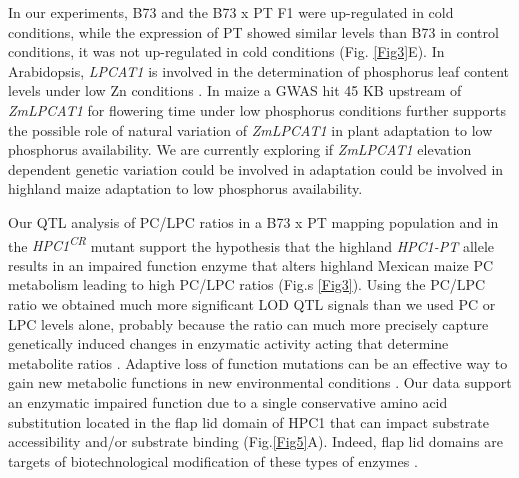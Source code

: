 \documentclass[9pt,twocolumn,twoside,lineno]{BioRxiv}
\begin{document}
In our experiments, B73 and the B73 x PT F1 were up-regulated in cold conditions, while the expression of PT showed similar levels than B73 in control conditions, it was not up-regulated in cold conditions (Fig. \ref{Fig3}E).
In Arabidopsis, \textit{LPCAT1} is involved in the determination of phosphorus leaf content levels under low Zn conditions \cite{Kisko2018-zm}.
In maize a GWAS hit 45 KB upstream of \textit{ZmLPCAT1} for flowering time under low phosphorus conditions further supports the possible role of natural variation of \textit{ZmLPCAT1} in plant adaptation to low phosphorus availability. 
We are currently exploring if \textit{ZmLPCAT1} elevation dependent genetic variation could be involved in adaptation could be involved in highland maize adaptation to low phosphorus availability.

Our QTL analysis of PC/LPC ratios in a B73 x PT mapping population and in the \textit{HPC1\textsuperscript{CR}} mutant support the hypothesis that the highland \textit{HPC1-PT} allele results in an impaired function enzyme that alters highland Mexican maize PC metabolism leading to high PC/LPC ratios (Fig.s \ref{Fig3}). 
Using the PC/LPC ratio we obtained much more significant LOD QTL signals than we used PC or LPC levels alone, probably because the ratio can much more precisely capture genetically induced changes in enzymatic activity acting that determine metabolite ratios \cite{Petersen2012-ii}.
Adaptive loss of function mutations can be an effective way to gain new metabolic functions in new environmental conditions \cite{Hottes2013-np}. 
Our data support an enzymatic impaired function due to a single conservative amino acid substitution located in the flap lid domain of HPC1 that can impact substrate  accessibility and/or substrate binding (Fig.\ref{Fig5}A). 
Indeed, flap lid domains are targets of biotechnological modification of these types of enzymes \cite{Khan2017-ua}.
\end{document}
